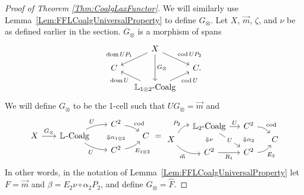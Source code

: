 \begin{proof}[Proof of Theorem \ref{Thm:CoalgLaxFunctor}]
	We will similarly use Lemma~\ref{Lem:FFLCoalgUniversalProperty} to define $G_{\otimes}$. Let $X$, $\vec{m}$, $\zeta$, and $\nu$ be as defined earlier in the section. $G_{\otimes}$ is a morphism of spans
	\[
	\begin{tikzcd}[row sep=small,column sep=small]
		{} & X \dlar[swap]{\dom UP_1} \drar{\cod UP_2} \ar{dd}{G_{\otimes}} & \\
		C && C. \\
		& \LCoalg[1\otimes2] \ular{\dom U} \urar[swap]{\cod U}
	\end{tikzcd}
	\]
	We will define $G_{\otimes}$ to be the 1-cell such that $UG_{\otimes}=\vec{m}$ and
	\[
	\begin{tikzcd}[row sep=0ex, column sep=4ex, bend angle=15, baseline=(B.base)]
		{} && |[alias=domA]| C^2 \drar[bend left][]{\cod} & \\
		|[alias=B]| X \rar{G_{\otimes}} 
			& \LCoalg \urar[bend left][]{U} \drar[bend right][swap]{U} 
			&& C \\
		&& |[alias=codA]| C^2 \urar[bend right][swap]{E_{1\otimes2}}
		\twocellA{\alpha_{1\otimes2}}
	\end{tikzcd}
	=
	\begin{tikzcd}[bend angle=25, row sep=0ex, column sep=3ex]
		& |[alias=domA]| \LCoalg[2] \rar{U} \ar{ddr}[description]{U}
			& |[alias=domB]| C^2 \drar[bend left][]{\cod} & \\
		X \urar[bend left][]{P_2} \drar[bend right][swap]{\vec{m}}
			&&& C \\
		& |[alias=codA]| C^2 \rar[swap]{R_1}
			& |[alias=codB]| C^2 \urar[bend right][swap]{E_2} &
		\twocellA{\nu}
		\twocellB{\alpha_2}
	\end{tikzcd}
	\]
	In other words, in the notation of Lemma~\ref{Lem:FFLCoalgUniversalProperty} let $F=\vec{m}$ and $\beta=E_2\nu\circ\alpha_2P_2$, and define $G_{\otimes}=\hat{F}$.


\end{proof}
